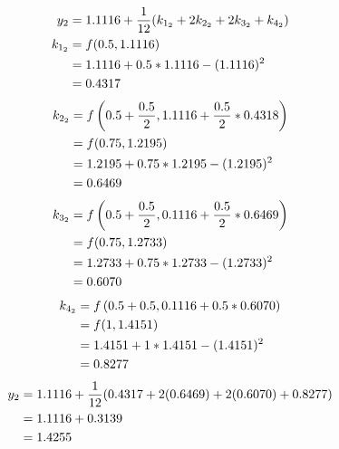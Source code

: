 	\begin{align}
		y_{2} &= 1.1116 + \frac{1}{12}(k_{1_{2}} + 2k_{2_{2}} + 2k_{3_{2}} + k_{4_{2}})& \\
		k_{1_{2}} &= f(0.5,1.1116)& \notag \\
		&= 1.1116 + 0.5*1.1116 - (1.1116)^{2}& \notag \\
		&= 0.4317&
	\end{align}
	\begin{align}
		k_{2_{2}} &= f
			\left(
				0.5 + \frac{0.5}{2}, 1.1116 + \frac{0.5}{2}*0.4318
			\right)
			& \notag \\
		&= f(0.75, 1.2195)& \notag \\
		&= 1.2195 + 0.75*1.2195 - (1.2195)^{2}& \notag \\
		&= 0.6469&
	\end{align}
	\begin{align}
		k_{3_{2}} &= f
			\left(
				0.5 + \frac{0.5}{2}, 0.1116 + \frac{0.5}{2}*0.6469
			\right)
			& \notag \\
		&= f(0.75, 1.2733)& \notag \\
		&= 1.2733 + 0.75*1.2733 - (1.2733)^{2}& \notag \\
		&= 0.6070&
	\end{align}
	\begin{align}
		k_{4_{2}} &= f
			\left(
				0.5 + 0.5, 0.1116 + 0.5*0.6070
			\right)
			& \notag \\
		&= f(1, 1.4151)& \notag \\
		&= 1.4151 + 1*1.4151 - (1.4151)^{2}& \notag \\
		&= 0.8277&
	\end{align}
	\begin{align}
		y_{2} &= 1.1116 + \frac{1}{12}(0.4317 + 2(0.6469) + 2(0.6070) + 0.8277)& \notag \\
		&= 1.1116 + 0.3139& \notag \\
		&= 1.4255&
	\end{align}
